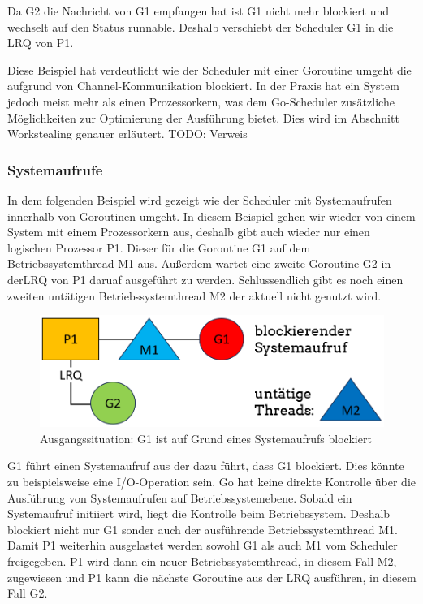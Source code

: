 \documentclass[fontsize=12pt,paper=a4,twoside=semi,parskip=half-,headsepline,headinclude]{scrreprt}
\begin{document}
Da G2 die Nachricht von G1 empfangen hat ist G1 nicht mehr blockiert und wechselt auf den Status runnable. Deshalb verschiebt der Scheduler G1 in die LRQ von P1.

Diese Beispiel hat verdeutlicht wie der Scheduler mit einer Goroutine umgeht die aufgrund von Channel-Kommunikation blockiert. In der Praxis hat ein System jedoch meist mehr als einen Prozessorkern, was dem Go-Scheduler zusätzliche Möglichkeiten zur Optimierung der Ausführung bietet. Dies wird im Abschnitt Workstealing genauer erläutert. TODO: Verweis

\subsubsection{Systemaufrufe}

In dem folgenden Beispiel wird gezeigt wie der Scheduler mit Systemaufrufen innerhalb von Goroutinen umgeht. In diesem Beispiel gehen wir wieder von einem System mit einem Prozessorkern aus, deshalb gibt auch wieder nur einen logischen Prozessor P1. Dieser für die Goroutine G1 auf dem Betriebssystemthread M1 aus. Außerdem wartet eine zweite Goroutine G2 in derLRQ von P1 daruaf ausgeführt zu werden. Schlussendlich gibt es noch einen zweiten untätigen Betriebssystemthread M2 der aktuell nicht genutzt wird.

\begin{figure}[h]
	\centering
	\includegraphics[scale=0.5]{figures/GoroutineSystemaufrufe1.png}
	\caption{Ausgangssituation: G1 ist auf Grund eines Systemaufrufs blockiert}
	\label{fig:GoroutineSystemaufrufe1}
\end{figure}

G1 führt einen Systemaufruf aus der dazu führt, dass G1 blockiert. Dies könnte zu beispielsweise eine I/O-Operation sein. Go hat keine direkte Kontrolle über die Ausführung von Systemaufrufen auf Betriebssystemebene. Sobald ein Systemaufruf initiiert wird, liegt die Kontrolle beim Betriebssystem. Deshalb blockiert nicht nur G1 sonder auch der ausführende Betriebssystemthread M1. Damit P1 weiterhin ausgelastet werden sowohl G1 als auch M1 vom Scheduler freigegeben. P1 wird dann ein neuer Betriebssystemthread, in diesem Fall M2, zugewiesen und P1 kann die nächste Goroutine aus der LRQ ausführen, in diesem Fall G2.
\end{document}
